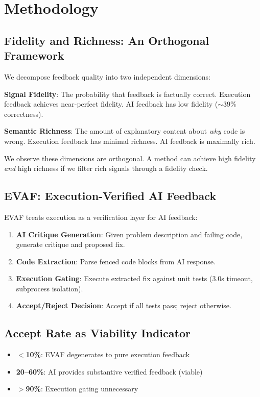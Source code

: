 \section{Methodology}
\label{sec:methodology}

\subsection{Fidelity and Richness: An Orthogonal Framework}

We decompose feedback quality into two independent dimensions:

\textbf{Signal Fidelity}: The probability that feedback is factually correct. Execution feedback achieves near-perfect fidelity. AI feedback has low fidelity ($\sim$39\% correctness).

\textbf{Semantic Richness}: The amount of explanatory content about \emph{why} code is wrong. Execution feedback has minimal richness. AI feedback is maximally rich.

We observe these dimensions are orthogonal. A method can achieve high fidelity \emph{and} high richness if we filter rich signals through a fidelity check.

\subsection{EVAF: Execution-Verified AI Feedback}

EVAF treats execution as a verification layer for AI feedback:

\begin{enumerate}
    \item \textbf{AI Critique Generation}: Given problem description and failing code, generate critique and proposed fix.
    \item \textbf{Code Extraction}: Parse fenced code blocks from AI response.
    \item \textbf{Execution Gating}: Execute extracted fix against unit tests (3.0s timeout, subprocess isolation).
    \item \textbf{Accept/Reject Decision}: Accept if all tests pass; reject otherwise.
\end{enumerate}

\subsection{Accept Rate as Viability Indicator}

\begin{itemize}
    \item \textbf{$<$10\%}: EVAF degenerates to pure execution feedback
    \item \textbf{20--60\%}: AI provides substantive verified feedback (viable)
    \item \textbf{$>$90\%}: Execution gating unnecessary
\end{itemize}

